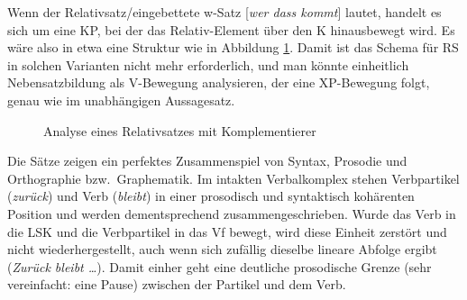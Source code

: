 
Wenn der Relativsatz\slash eingebettete w-Satz [\textit{wer dass kommt}] lautet, handelt es sich um eine KP, bei der das Relativ-Element über den K hinausbewegt wird.
Es wäre also in etwa eine Struktur wie in Abbildung \ref{fig:relativsatzzmitkomp}.
Damit ist das Schema für RS in solchen Varianten nicht mehr erforderlich, und man könnte einheitlich Nebensatzbildung als V-Bewegung analysieren, der eine XP-Bewegung folgt, genau wie im unabhängigen Aussagesatz.

\begin{figure}[!htbp]
  \begin{center}
  \end{center}
  \caption{Analyse eines Relativsatzes mit Komplementierer}
  \label{fig:relativsatzzmitkomp}
\end{figure}


Die Sätze zeigen ein perfektes Zusammenspiel von Syntax, Prosodie und Orthographie bzw.\ Graphematik.
Im intakten Verbalkomplex stehen Verbpartikel (\textit{zurück}) und Verb (\textit{bleibt}) in einer prosodisch und syntaktisch kohärenten Position und werden dementsprechend zusammengeschrieben.
Wurde das Verb in die LSK und die Verbpartikel in das Vf bewegt, wird diese Einheit zerstört und nicht wiederhergestellt, auch wenn sich zufällig dieselbe lineare Abfolge ergibt (\textit{Zurück bleibt \ldots}).
Damit einher geht eine deutliche prosodische Grenze (sehr vereinfacht: eine Pause) zwischen der Partikel und dem Verb.



